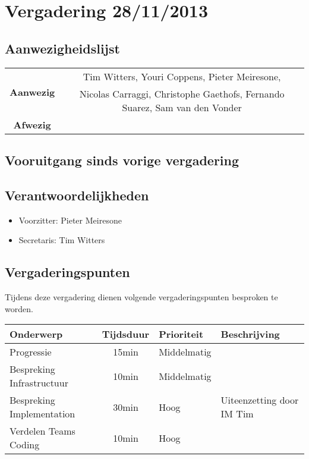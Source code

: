 \section{Vergadering 28/11/2013}
\subsection{Aanwezigheidslijst}
\begin{table}[htbp]
	\centering
	\begin{tabular}{c|c}
		\multirow{2}{*}{\textbf{Aanwezig}} & Tim Witters, Youri Coppens, Pieter Meiresone, \\
		& Nicolas Carraggi,  Christophe Gaethofs, Fernando Suarez, Sam van den Vonder \\
		\hline
		\textbf{Afwezig} & \\
	\end{tabular}
\end{table}

\subsection{Vooruitgang sinds vorige vergadering}


\subsection{Verantwoordelijkheden}
\begin{itemize}
	\item Voorzitter: Pieter Meiresone
	\item Secretaris: Tim Witters
\end{itemize}
\subsection{Vergaderingspunten}

Tijdens deze vergadering dienen volgende vergaderingspunten besproken te worden.
\begin{table} [H]
	\centering
	\begin{tabular} {l|cll}
		\textbf{Onderwerp} & \textbf{Tijdsduur} & \textbf{Prioriteit} & \textbf{Beschrijving} \\ %
		\hline
		Progressie & 15min & Middelmatig & \\
		Bespreking Infrastructuur & 10min & Middelmatig & \\
		Bespreking Implementation & 30min & Hoog & Uiteenzetting door IM Tim \\
		Verdelen Teams Coding & 10min & Hoog & \\
	\end{tabular}
\end{table}

